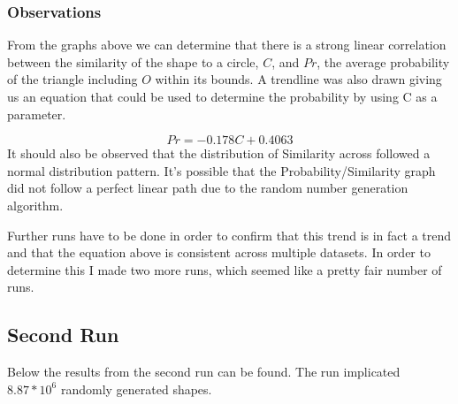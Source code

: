 \documentclass[9pt,onecolumn,oneside]{osajnl}
\begin{document}
\begin{center}
\end{center}



\subsubsection{Observations}

	From the graphs above we can determine that there is a strong linear correlation between the similarity of the shape to a circle, \(C\), and \(Pr\), the average probability of the triangle including \(O\) within its bounds. A trendline was also drawn giving us an equation that could be used to determine the probability by using C as a parameter.
    
    \[Pr = -0.178C + 0.4063\]
    It should also be observed that the distribution of Similarity across followed a normal distribution pattern. It’s possible that the Probability/Similarity graph did not follow a perfect linear path due to the random number generation algorithm.
    
	Further runs have to be done in order to confirm that this trend is in fact a trend and that the equation above is consistent across multiple datasets. In order to determine this I made two more runs, which seemed like a pretty fair number of runs.


\subsection{Second Run}

	Below the results from the second run can be found. The run implicated \(8.87*10^{6}\) randomly generated shapes. 
\end{document}
